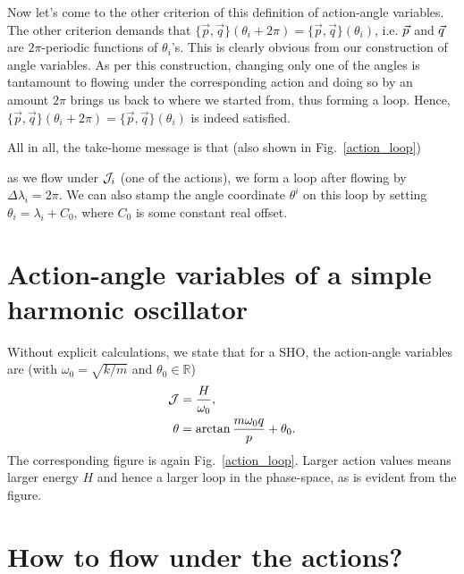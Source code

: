 \hfill \break



Now let's come to the other criterion of this definition of action-angle variables.
The other criterion demands that 
{$\{ \vec{p}, \vec{q} \}(\theta_i + 2 \pi)  = \{ \vec{p}, \vec{q} \}(\theta_i ) $},
i.e. $\vec{p}$ and $\vec{q}$ are $2 \pi$-periodic
functions of $\theta_i$'s. This is clearly obvious from our construction of angle 
variables. As per this construction, changing only one of the angles
is tantamount to flowing under the corresponding action and doing so by an
amount $2 \pi$ brings us back to where we started from, thus forming  a loop. 
Hence, {$\{ \vec{p}, \vec{q} \}(\theta_i + 2 \pi)  = \{ \vec{p}, \vec{q} \}(\theta_i ) $} is indeed satisfied.





All in all, the take-home message is that (also shown in Fig.~\ref{action_loop})\\
\begin{tcolorbox}
as we flow under $\mathcal{J}_i$ (one of the actions), we form a loop after flowing by $\Delta \lambda_i = 2 \pi$.
We can also stamp the angle coordinate $\theta^i$ on this loop by setting $\theta_i = \lambda_i + C_0$, where 
$C_0$ is some constant real offset.
\end{tcolorbox}




\section{Action-angle variables of a simple harmonic oscillator}


Without explicit calculations, we state that for a SHO, the action-angle
variables are (with $\omega_0 =  \sqrt{k/m}$ and $\theta_0 \in \mathbb{R}$)
\begin{align}
\mathcal{J}  &= \frac{H}{\omega_0}  ,   \\
\theta    & = \arctan \frac{m \omega_0 q}{p} + \theta_0  .
\end{align}
The corresponding figure is again Fig.~\ref{action_loop}. Larger action
values means larger energy $H$ and hence a larger loop in the phase-space,
as is evident from the figure.





\section{How to flow under the actions?}






